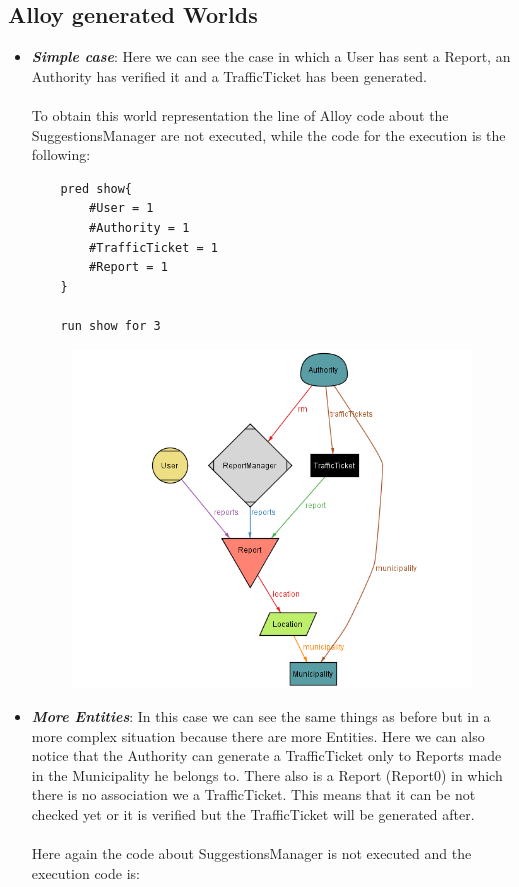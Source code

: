 \subsection{Alloy generated Worlds}
    \vspace{10px}
    \begin{itemize}
        \item \textit{\textbf{Simple case}}: Here we can see the case in which a User has sent a Report, an Authority has verified it and a TrafficTicket has been generated.\\\\
        To obtain this world representation the line of Alloy code about the SuggestionsManager are not executed, while the code for the execution is the following:
        
\begin{verbatim}
    pred show{
        #User = 1
        #Authority = 1
        #TrafficTicket = 1
        #Report = 1
    }
    
    run show for 3
\end{verbatim}
        
        \begin{figure}[h]
            \centering
            \includegraphics[scale=0.5]{Images/alloy_simple.png}
        \end{figure}
        
        \vspace{40px}
        
        
        \item \textit{\textbf{More Entities}}: In this case we can see the same things as before but in a more complex situation because there are more Entities. Here we can also notice that the Authority can generate a TrafficTicket only to Reports made in the Municipality he belongs to.
        There also is a Report (Report0) in which there is no association we a TrafficTicket. This means that it can be not checked yet or it is verified but the TrafficTicket will be generated after.\\\\
        Here again the code about SuggestionsManager is not executed and the execution code is:
        

\end{itemize}
